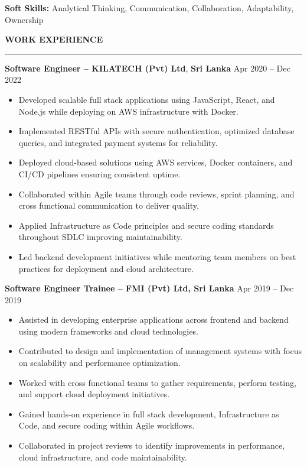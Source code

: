 \documentclass[10pt,letterpaper]{article}
\begin{document}
\textbf{Soft Skills:} Analytical Thinking, Communication, Collaboration, Adaptability, Ownership

\vspace{8pt}

\textbf{WORK EXPERIENCE}\\[-8pt]
\noindent\rule{\textwidth}{1pt}

\vspace{-2pt}

\textbf{Software Engineer -- KILATECH (Pvt) Ltd}, \textbf{Sri Lanka} \hfill Apr 2020 -- Dec 2022

\vspace{-1pt}

\begin{itemize}
\item Developed scalable full stack applications using JavaScript, React, and Node.js while deploying on AWS infrastructure with Docker.
\item Implemented RESTful APIs with secure authentication, optimized database queries, and integrated payment systems for reliability.
\item Deployed cloud-based solutions using AWS services, Docker containers, and CI/CD pipelines ensuring consistent uptime.
\item Collaborated within Agile teams through code reviews, sprint planning, and cross functional communication to deliver quality.
\item Applied Infrastructure as Code principles and secure coding standards throughout SDLC improving maintainability.
\item Led backend development initiatives while mentoring team members on best practices for deployment and cloud architecture.
\end{itemize}

\textbf{Software Engineer Trainee -- FMI (Pvt) Ltd, Sri Lanka} \hfill Apr 2019 -- Dec 2019

\vspace{-1pt}

\begin{itemize}
\item Assisted in developing enterprise applications across frontend and backend using modern frameworks and cloud technologies.
\item Contributed to design and implementation of management systems with focus on scalability and performance optimization.
\item Worked with cross functional teams to gather requirements, perform testing, and support cloud deployment initiatives.
\item Gained hands-on experience in full stack development, Infrastructure as Code, and secure coding within Agile workflows.
\item Collaborated in project reviews to identify improvements in performance, cloud infrastructure, and code maintainability.
\end{itemize}
\end{document}
